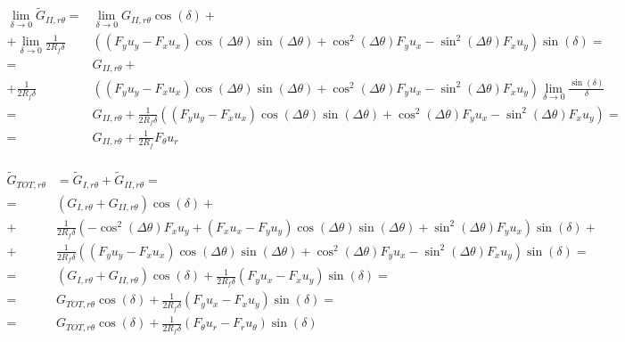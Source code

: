 \documentclass[a4paper]{jpconf}
\begin{document}
\begin{equation}
\begin{split}
\lim_{\delta\rightarrow 0}\widetilde{G}_{II,r\theta} = &\lim_{\delta\rightarrow 0}G_{II,r\theta}\cos\left(\delta\right)+\\
+\lim_{\delta\rightarrow 0}\frac{1}{2R_{f}\delta}&\left(\left(F_{y}u_{y}-F_{x}u_{x}\right)\cos\left(\Delta\theta\right)\sin\left(\Delta\theta\right)+\cos^{2}\left(\Delta\theta\right)F_{y}u_{x}-\sin^{2}\left(\Delta\theta\right)F_{x}u_{y}\right)\sin\left(\delta\right)=\\
= &G_{II,r\theta}+\\
+\frac{1}{2R_{f}\delta}&\left(\left(F_{y}u_{y}-F_{x}u_{x}\right)\cos\left(\Delta\theta\right)\sin\left(\Delta\theta\right)+\cos^{2}\left(\Delta\theta\right)F_{y}u_{x}-\sin^{2}\left(\Delta\theta\right)F_{x}u_{y}\right)\lim_{\delta\rightarrow 0}\frac{\sin\left(\delta\right)}{\delta}\\
= &G_{II,r\theta}+\frac{1}{2R_{f}\delta}\left(\left(F_{y}u_{y}-F_{x}u_{x}\right)\cos\left(\Delta\theta\right)\sin\left(\Delta\theta\right)+\cos^{2}\left(\Delta\theta\right)F_{y}u_{x}-\sin^{2}\left(\Delta\theta\right)F_{x}u_{y}\right)=\\
= &G_{II,r\theta}+\frac{1}{2R_{f}}F_{\theta}u_{r}\\
\end{split}
\end{equation}

\begin{equation}
\begin{split}
\widetilde{G}_{TOT,r\theta} &= \widetilde{G}_{I,r\theta} + \widetilde{G}_{II,r\theta}=\\
=&\left(G_{I,r\theta}+G_{II,r\theta}\right)\cos\left(\delta\right)+\\
+ &\frac{1}{2R_{f}\delta}\left(-\cos^{2}\left(\Delta\theta\right) F_{x}u_{y}+\left(F_{x}u_{x}-F_{y}u_{y}\right)\cos\left(\Delta\theta\right)\sin\left(\Delta\theta\right)+\sin^{2}\left(\Delta\theta\right)F_{y}u_{x}\right)\sin\left(\delta\right)+\\
+ &\frac{1}{2R_{f}\delta}\left(\left(F_{y}u_{y}-F_{x}u_{x}\right)\cos\left(\Delta\theta\right)\sin\left(\Delta\theta\right)+\cos^{2}\left(\Delta\theta\right)F_{y}u_{x}-\sin^{2}\left(\Delta\theta\right)F_{x}u_{y}\right)\sin\left(\delta\right)=\\
=&\left(G_{I,r\theta}+G_{II,r\theta}\right)\cos\left(\delta\right)+\frac{1}{2R_{f}\delta}\left(F_{y}u_{x}-F_{x}u_{y}\right)\sin\left(\delta\right)=\\
=&G_{TOT,r\theta}\cos\left(\delta\right)+\frac{1}{2R_{f}\delta}\left(F_{y}u_{x}-F_{x}u_{y}\right)\sin\left(\delta\right)=\\
=&G_{TOT,r\theta}\cos\left(\delta\right)+\frac{1}{2R_{f}\delta}\left(F_{\theta}u_{r}-F_{r}u_{\theta}\right)\sin\left(\delta\right)
\end{split}
\end{equation}
\end{document}
